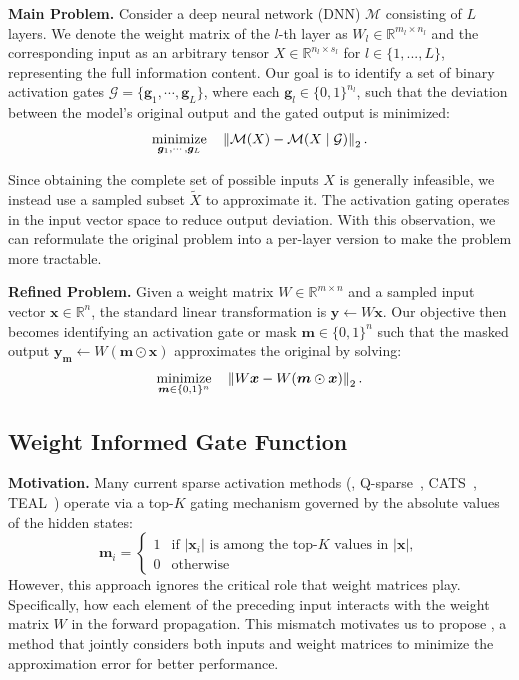{
	\textbf{Main Problem.}  
	Consider a deep neural network (DNN) $\mathcal{M}$ consisting of $L$ layers. We denote the weight matrix of the $l$-th layer as $W_l \in \mathbb{R}^{m_l \times n_l}$ and the corresponding input as an arbitrary tensor $X \in \mathbb{R}^{n_l \times s_l}$ for $l \in \{1, ..., L\}$, representing the full information content.  
	Our goal is to identify a set of binary activation gates $\mathcal{G} = \{\bm{g}_1, \cdots, \bm{g}_L\}$, where each $\bm{g}_l \in \{0, 1\}^{n_l}$, such that the deviation between the model's original output and the gated output is minimized:
	\begin{equation}
		\mathop{\text{minimize}}_{\bm{g}_1, \cdots, \bm{g}_L} \quad \norm{\mathcal{M}(X) - \mathcal{M}(X \mid \mathcal{G})}_2.
	\end{equation}
	
	Since obtaining the complete set of possible inputs $X$ is generally infeasible, we instead use a sampled subset $\tilde{X}$ to approximate it. The activation gating operates in the input vector space to reduce output deviation. With this observation, we can reformulate the original problem into a per-layer version to make the problem more tractable.
	
	\textbf{Refined Problem.}  
	Given a weight matrix $W \in \mathbb{R}^{m \times n}$ and a sampled input vector $\bm{x} \in \mathbb{R}^{n}$, the standard linear transformation is $\bm{y} \gets W \bm{x}$.  
	Our objective then becomes identifying an activation gate or mask $\bm{m} \in \{0, 1\}^{n}$ such that the masked output $\bm{y}_{\bm{m}} \gets W(\bm{m} \odot \bm{x})$ approximates the original by solving:
	\begin{equation}\label{main.prob}
		\mathop{\text{minimize}}_{\bm{m} \in \{0, 1\}^{n}} \quad  \norm{W \bm{x} - W(\bm{m} \odot \bm{x})}_2.
	\end{equation}
}

\subsection{Weight Informed Gate Function}

\textbf{Motivation.}
Many current sparse activation methods (\eg, Q-sparse~\citep{wang2024q}, CATS~\citep{lee2024catscontextuallyawarethresholdingsparsity}, TEAL~\citep{liu2024trainingfreeactivationsparsitylarge}) operate via a top-$K$ gating mechanism governed by the absolute values of the hidden states:
\begin{equation}
	\bm{m}_i = \begin{cases}
		1 & \text{if } |\bm{x}_i| \text{ is among the top-$K$ values in } |\bm{x}|, \\
		0 & \text{otherwise}
	\end{cases}
\end{equation}
However, this approach ignores the critical role that weight matrices play. Specifically, how each element of the preceding input interacts with the weight matrix $W$ in the forward propagation. This mismatch motivates us to propose \algacro{}, a method that jointly considers both inputs and weight matrices to minimize the approximation error for better performance.

